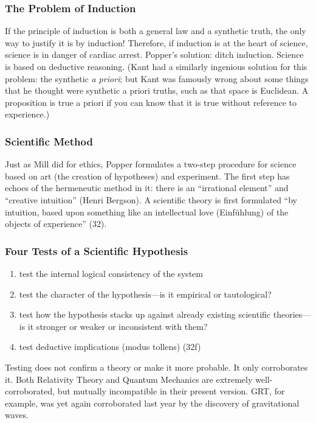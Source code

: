 \documentclass[xcolor=dvipsnames]{beamer}
\begin{document}
\begin{frame}
  \frametitle{The Problem of Induction}
  If the principle of induction is both a general law and a synthetic
  truth, the only way to justify it is by induction! Therefore, if
  induction is at the heart of science, science is in danger of
  cardiac arrest. Popper's solution: ditch induction. Science is based
  on deductive reasoning. (Kant had a similarly ingenious solution for
  this problem: the synthetic \emph{a priori}; but Kant was famously
  wrong about some things that he thought were synthetic a priori
  truths, such as that space is Euclidean. A proposition is true a
  priori if you can know that it is true without reference to
  experience.)
\end{frame}

\begin{frame}
  \frametitle{Scientific Method}
  Just as Mill did for ethics, Popper formulates a two-step procedure
  for science based on art (the creation of hypotheses) and
  experiment. The first step has echoes of the hermeneutic method in
  it: there is an ``irrational element'' and ``creative intuition''
  (Henri Bergson). A scientific theory is first formulated ``by
  intuition, based upon something like an intellectual love
  (Einf{\"u}hlung) of the objects of experience'' (32).
\end{frame}

\begin{frame}
  \frametitle{Four Tests of a Scientific Hypothesis}
  \begin{enumerate}
  \item test the internal logical consistency of the system
  \item test the character of the hypothesis---is it empirical or
    tautological?
  \item test how the hypothesis stacks up against already existing
    scientific theories---is it stronger or weaker or inconsistent
    with them?
  \item test deductive implications (modus tollens) (32f)
  \end{enumerate}
Testing does not confirm a theory or make it more probable. It only
corroborates it. Both Relativity Theory and Quantum Mechanics are
extremely well-corroborated, but mutually incompatible in their
present version. GRT, for example, was yet again corroborated last
year by the discovery of gravitational waves.
\end{frame}
\end{document}
